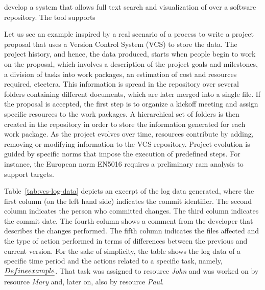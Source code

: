\citep{DBLP:conf/vissoft/FeinerA18} develop a system that allows full text search and visualization of over a software repository. The tool supports 

Let us see an example inspired by a real scenario of a process to write a project proposal that uses a Version Control System (VCS) to store the data. The project history, and hence, the data produced, starts when people begin to work on the proposal, which involves a description of the project goals and milestones, a division of tasks into work packages, an estimation of cost and resources required, etcetera. This information is spread in the repository over several folders containing different documents, which are later merged into a single file. If the proposal is accepted, the first step is to organize a kickoff meeting and assign specific resources to the work packages. A hierarchical set of folders is then created in the repository in order to store the information generated for each work package. As the project evolves over time, resources contribute by adding, removing or modifying information to the VCS repository. %
Project evolution is guided by specific norms that impose the execution of predefined steps. For instance, the European norm EN5016 requires a preliminary \gls{ram} analysis to support targets. 

Table~\ref{tab:vcs-log-data} depicts an excerpt of the log data generated, where the first column (on the left hand side) indicates the commit identifier. The second column indicates the person who committed changes. The third column indicates the commit date. The fourth column shows a comment from the developer that describes the changes performed.
The fifth column indicates the files affected and the type of action performed in terms of differences between the previous and current version. 
For the sake of simplicity, the table shows the log data of a specific time period and the actions related to a specific task, namely, $\emph{Define example}$. That task was assigned to resource \emph{John} %
and was worked on by resource \emph{Mary} and, later on, also by resource \emph{Paul}.


